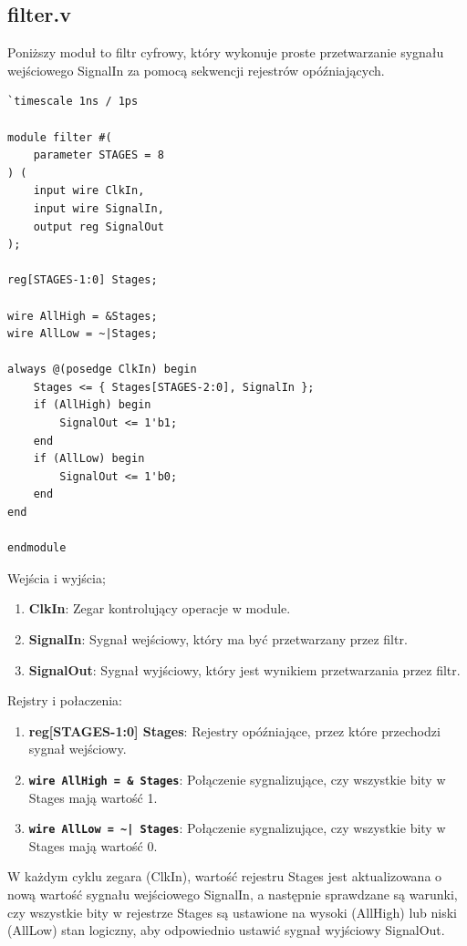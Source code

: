 \documentclass[12pt, a4paper]{article}
\begin{document}
\subsection{filter.v}
Poniższy moduł to filtr cyfrowy, który wykonuje proste przetwarzanie sygnału wejściowego SignalIn za pomocą sekwencji rejestrów opóźniających.
\begin{lstlisting}[style=prettyverilog,caption={Moduł filter.v}]
`timescale 1ns / 1ps

module filter #(
	parameter STAGES = 8
) (
	input wire ClkIn,
	input wire SignalIn,
	output reg SignalOut
);

reg[STAGES-1:0] Stages;

wire AllHigh = &Stages;
wire AllLow = ~|Stages;

always @(posedge ClkIn) begin
	Stages <= { Stages[STAGES-2:0], SignalIn };
	if (AllHigh) begin
		SignalOut <= 1'b1;
	end
	if (AllLow) begin
		SignalOut <= 1'b0;
	end
end

endmodule
\end{lstlisting}
\newpage
Wejścia i wyjścia;
\begin{enumerate}
    \item \textbf{\fontsize{11}{10}\selectfont ClkIn}: Zegar kontrolujący operacje w module.
    \item \textbf{\fontsize{11}{10}\selectfont SignalIn}: Sygnał wejściowy, który ma być przetwarzany przez filtr.
    \item \textbf{\fontsize{11}{10}\selectfont SignalOut}: Sygnał wyjściowy, który jest wynikiem przetwarzania przez filtr.
\end{enumerate}
\newline{}
Rejstry i połaczenia:
\begin{enumerate}
    \item \textbf{\fontsize{11}{10}\selectfont reg[STAGES-1:0] Stages}: Rejestry opóźniające, przez które przechodzi sygnał wejściowy.
 \item \textbf{\fontsize{11}{10}\selectfont\texttt{wire AllHigh = \& Stages}}: Połączenie sygnalizujące, czy wszystkie bity w Stages mają wartość 1.
    \item \textbf{\fontsize{11}{10}\selectfont\texttt{wire AllLow = \textasciitilde| Stages}}: Połączenie sygnalizujące, czy wszystkie bity w Stages mają wartość 0.
\end{enumerate}
W każdym cyklu zegara (ClkIn), wartość rejestru Stages jest aktualizowana o nową wartość sygnału wejściowego SignalIn, a następnie sprawdzane są warunki, czy wszystkie bity w rejestrze Stages są ustawione na wysoki (AllHigh) lub niski (AllLow) stan logiczny, aby odpowiednio ustawić sygnał wyjściowy SignalOut.
\end{document}
